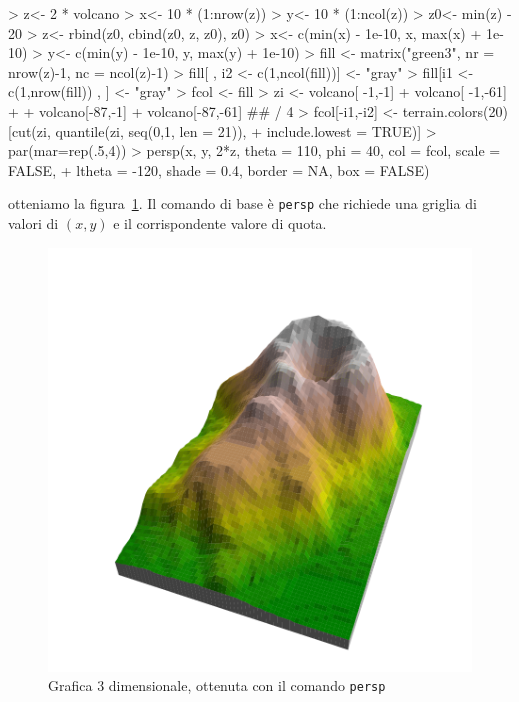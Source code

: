 \documentclass[onecolumn,11pt]{book}
\begin{document}
\begin{Schunk}
\begin{Sinput}
> z<- 2 * volcano
> x<- 10 * (1:nrow(z))
> y<- 10 * (1:ncol(z))
> z0<- min(z) - 20
> z<- rbind(z0, cbind(z0, z, z0), z0)
> x<- c(min(x) - 1e-10, x, max(x) + 1e-10)
> y<- c(min(y) - 1e-10, y, max(y) + 1e-10)
> fill <- matrix("green3", nr = nrow(z)-1, nc = ncol(z)-1)
> fill[ , i2 <- c(1,ncol(fill))] <- "gray"
> fill[i1 <- c(1,nrow(fill)) , ] <- "gray"
> fcol <- fill
> zi <- volcano[ -1,-1] + volcano[ -1,-61] +
+ volcano[-87,-1] + volcano[-87,-61] ## / 4
> fcol[-i1,-i2] <- terrain.colors(20)[cut(zi, quantile(zi, seq(0,1, len = 21)),
+ include.lowest = TRUE)]
> par(mar=rep(.5,4))
> persp(x, y, 2*z, theta = 110, phi = 40, col = fcol, scale = FALSE,
+ ltheta = -120, shade = 0.4, border = NA, box = FALSE)
\end{Sinput}
\end{Schunk}
otteniamo la figura~\ref{vulcano3D}. Il comando di base \`e \texttt{persp} che richiede una griglia di valori di $(x,y)$ e il corrispondente valore di quota.
\begin{figure}[htbp]
\begin{center}
\includegraphics{statisticaconR-367}

\caption{Grafica 3 dimensionale, ottenuta con il comando \texttt{persp}}
\label{vulcano3D}
\end{center}
\end{figure}
\end{document}
